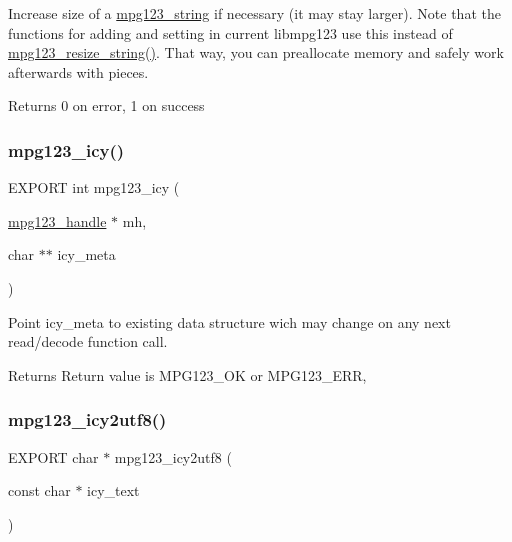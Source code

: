 Increase size of a \hyperlink{structmpg123__string}{mpg123\+\_\+string} if necessary (it may stay larger). Note that the functions for adding and setting in current libmpg123 use this instead of \hyperlink{group__mpg123__metadata_gafa0fa74b81fa70e24a8fd89e88e4fe77}{mpg123\+\_\+resize\+\_\+string()}. That way, you can preallocate memory and safely work afterwards with pieces. \begin{DoxyReturn}{Returns}
0 on error, 1 on success 
\end{DoxyReturn}
\mbox{\label{group__mpg123__metadata_ga4c5933e4b03a7c5eefc7802734d32bef}} 
\subsubsection{\texorpdfstring{mpg123\+\_\+icy()}{mpg123\_icy()}}
{\footnotesize\ttfamily E\+X\+P\+O\+RT int mpg123\+\_\+icy (\begin{DoxyParamCaption}\item[{\hyperlink{group__mpg123__init_ga6728e2839a395f3a07d4514da659faca}{mpg123\+\_\+handle} $\ast$}]{mh,  }\item[{char $\ast$$\ast$}]{icy\+\_\+meta }\end{DoxyParamCaption})}

Point icy\+\_\+meta to existing data structure wich may change on any next read/decode function call. \begin{DoxyReturn}{Returns}
Return value is M\+P\+G123\+\_\+\+OK or M\+P\+G123\+\_\+\+E\+RR, 
\end{DoxyReturn}
\mbox{\label{group__mpg123__metadata_gabcd631e74cb00a3be41b5539f0631faf}} 
\subsubsection{\texorpdfstring{mpg123\+\_\+icy2utf8()}{mpg123\_icy2utf8()}}
{\footnotesize\ttfamily E\+X\+P\+O\+RT char $\ast$ mpg123\+\_\+icy2utf8 (\begin{DoxyParamCaption}\item[{const char $\ast$}]{icy\+\_\+text }\end{DoxyParamCaption})}

